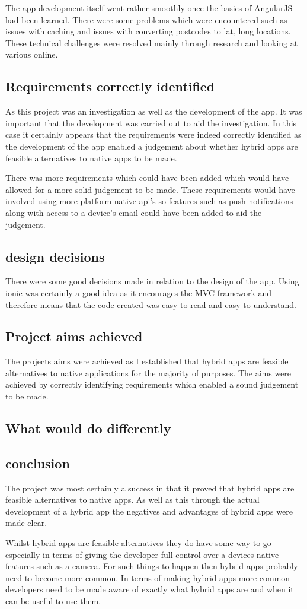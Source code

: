 The app development itself went rather smoothly once the basics of AngularJS had been learned. There were some problems which were encountered such as issues with caching and issues with converting postcodes to lat, long locations. These technical challenges were resolved mainly through research and looking at various online.      
\subsection{Requirements correctly identified}
As this project was an investigation as well as the development of the app. It was important that the development was carried out to aid the investigation. In this case it certainly appears that the requirements were indeed correctly identified as the development of the app enabled a judgement about whether hybrid apps are feasible alternatives to native apps to be made.

There was more requirements which could have been added which would have allowed for a more solid judgement to be made. These requirements would have involved using more platform native api's so features such as push notifications along with access to a device's email could have been added to aid the judgement.
\subsection{design decisions}
There were some good decisions made in relation to the design of the app. Using ionic was certainly a good idea as it encourages the MVC framework and therefore means that the code created was easy to read and easy to understand. 
\subsection{Project aims achieved}
The projects aims were achieved as I established that hybrid apps are feasible alternatives to native applications for the majority of purposes. The aims were achieved by correctly identifying requirements which enabled a sound judgement to be made.
\subsection{What would do differently}

\subsection{conclusion}
The project was most certainly a success in that it proved that hybrid apps are feasible alternatives to native apps. As well as this through the actual development of a hybrid app the negatives and advantages of hybrid apps were made clear.

Whilst hybrid apps are feasible alternatives they do have some way to go especially in terms of giving the developer full control over a devices native features such as a camera. For such things to happen then hybrid apps probably need to become more common. In terms of making hybrid apps more common developers need to be made aware of exactly what hybrid apps are and when it can be useful to use them. 
